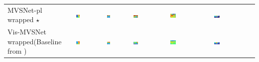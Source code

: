 \begin{longtable}{>{\tiny}M{25mm}M{26mm}M{26mm}M{26mm}M{26mm}M{26mm}}
            MVSNet-pl wrapped \(\star\) & \includegraphics[width=0.15\textwidth]{images/qualitatives/11_mvsnplbase_star/0000000-pred_depth.png} & \includegraphics[width=0.15\textwidth]{images/qualitatives/11_mvsnplbase_star/0000020-pred_depth.png} & \includegraphics[width=0.15\textwidth, trim={5cm 0 0 0},clip]{images/qualitatives/11_mvsnplbase_star/0000006-pred_depth.png} & \includegraphics[width=0.15\textwidth]{images/qualitatives/11_mvsnplbase_star/0000062-pred_depth.png} & \includegraphics[width=0.15\textwidth, trim={5cm 0 7.5cm 0},clip]{images/qualitatives/11_mvsnplbase_star/0000083-pred_depth.png}\\ 
            Vis-MVSNet wrapped\newline(Baseline from \cite{Zhang2020}) & \includegraphics[width=0.15\textwidth]{images/qualitatives/12_vismvsnbase/0000000-pred_depth.png} & \includegraphics[width=0.15\textwidth]{images/qualitatives/12_vismvsnbase/0000020-pred_depth.png} & \includegraphics[width=0.15\textwidth, trim={5cm 0 0 0},clip]{images/qualitatives/12_vismvsnbase/0000006-pred_depth.png} & \includegraphics[width=0.15\textwidth]{images/qualitatives/12_vismvsnbase/0000062-pred_depth.png} & \includegraphics[width=0.15\textwidth, trim={5cm 0 7.5cm 0},clip]{images/qualitatives/12_vismvsnbase/0000083-pred_depth.png}\\ 

\end{longtable}
